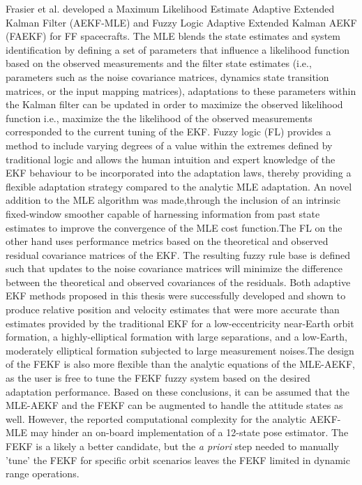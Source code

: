 Frasier et al. developed a Maximum Likelihood Estimate Adaptive Extended Kalman Filter (AEKF-MLE) and Fuzzy Logic Adaptive Extended Kalman AEKF (FAEKF) for FF spacecrafts. The MLE blends the state estimates and system identification by defining a set of parameters that influence a likelihood function based on the observed measurements and the filter state estimates (i.e., parameters such as the noise covariance matrices, dynamics state transition matrices, or the input mapping matrices), adaptations to these parameters within the Kalman filter can be updated in order to maximize the observed likelihood function i.e., maximize the the likelihood of the observed measurements corresponded to the current tuning of the EKF. Fuzzy logic (FL) provides a method to include varying degrees of a value within the extremes defined by traditional logic and allows the human intuition and expert knowledge of the EKF behaviour to be incorporated into the adaptation laws, thereby providing a flexible adaptation strategy compared to the analytic MLE adaptation. An novel addition to the MLE algorithm was made,through the inclusion of an intrinsic fixed-window smoother capable of harnessing information from past state estimates to improve the convergence of the MLE cost function.The FL on the other hand uses performance metrics based on the theoretical and observed residual covariance matrices of the EKF. The resulting fuzzy rule base is defined such that updates to the noise covariance matrices will minimize the difference between the theoretical and observed covariances of the residuals. Both adaptive EKF methods proposed in this thesis were successfully developed and shown to produce relative position and velocity estimates that were more accurate than estimates provided by the traditional EKF for a low-eccentricity near-Earth orbit formation, a highly-elliptical formation with large separations, and a low-Earth, moderately elliptical formation subjected to large measurement noises.The design of the FEKF is also more flexible than the analytic equations of the MLE-AEKF, as the user is free to tune the FEKF fuzzy system based on the desired adaptation performance. Based on these conclusions, it can be assumed that the MLE-AEKF and the FEKF can be augmented to handle the attitude states as well. However, the reported computational complexity for the analytic AEKF-MLE may hinder an on-board implementation of a 12-state pose estimator. The FEKF is a likely a better candidate, but the \textit{a priori} step needed to manually 'tune' the FEKF for specific orbit scenarios leaves the FEKF limited in dynamic range operations.

